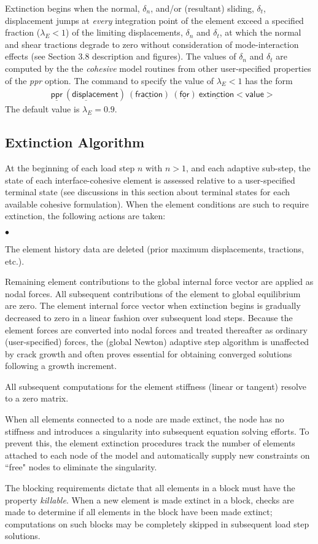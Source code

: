 \documentclass[11pt]{report}
\numberwithin{equation}{section}
\newcommand{\ul} {\underline}
\newcommand{\hv} {\mathsf}   %
\newcommand{\ti}{\emph}
\newcommand{\squishlist}{
 \begin{list}{$\bullet$}
  { \setlength{\itemsep}{0pt}
     \setlength{\parsep}{3pt}
     \setlength{\topsep}{3pt}
     \setlength{\partopsep}{0pt}
     \setlength{\leftmargin}{1.5em}
     \setlength{\labelwidth}{1em}
     \setlength{\labelsep}{0.5em} } }
\newcommand{\squishend}{
  \end{list}  }
\begin{document}
Extinction begins when the normal, $\delta_n$, and/or 
(resultant) sliding, $\delta_t$, displacement jumps at \ti{every} integration
point of the element exceed a specified fraction ($\lambda_E<1$) of the
limiting displacements, $\delta_n$ and $\delta_t$,
at which the normal and shear tractions degrade to zero
without consideration of mode-interaction effects (see Section
3.8 description and figures). The values of 
$\delta_n$ and $\delta_t$ are computed by the the \ti{cohesive}
model routines from other user-specified properties of the \ti{ppr} option.
The command to specify the value of $\lambda_E<1$ has the form
\begin{align*}
 &\hv{ \ul{ppr}\ (\ul{displace}ment)\ (\ul{fraction})\ (\ul{for})\  
 \ul{extinction} <value> }
\end{align*}
\noindent The default value is $\lambda_E=0.9$.
%
\subsection{Extinction Algorithm}
At the beginning of each load step $n$ with $n>1$, and each adaptive sub-step, 
the state of each interface-cohesive element is assessed relative to a user-specified
terminal state (see discussions in this section about terminal states for
each available cohesive formulation).  When the element conditions are such to
require extinction, the following actions are taken:
%
\small
\squishlist
\item The element history data are deleted (prior maximum displacements, tractions,
etc.).
\item Remaining element contributions to the global internal force vector are applied as
nodal forces. All subsequent contributions of the element to global equilibrium
are zero. The element internal force vector when extinction begins is gradually
decreased to zero in a linear fashion over subsequent load steps. Because the
element forces are converted into nodal forces and treated thereafter as
ordinary (user-specified) forces, the (global Newton) adaptive step algorithm is
unaffected by crack growth and often proves essential for obtaining converged
solutions following a growth increment.
\item All subsequent computations for the element stiffness (linear or
tangent) resolve to a zero matrix.
\item 	When all elements connected to a node are made extinct, the node has no
stiffness and introduces a singularity into subsequent equation solving efforts.
To prevent this, the element extinction procedures track the number of elements
attached to each node of the model and automatically supply new constraints on
``free" nodes to eliminate the singularity.
\item The blocking requirements dictate that all elements in a block must have
the property \ti{killable}. When a new element is made 
extinct in a block, checks are made to
determine if all elements in the block have been made extinct; computations on
such blocks may be completely skipped in subsequent load step solutions.
\squishend
\normalsize
%
%
\end{document}
